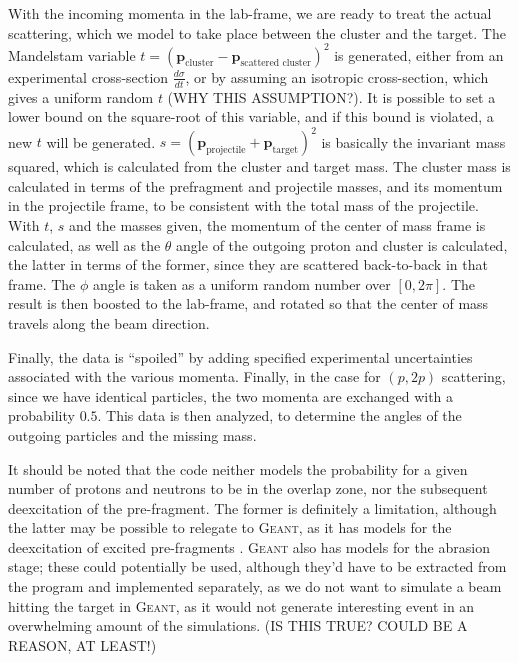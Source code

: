 \documentclass[12pt, a4paper]{article}
\newcommand{\fvec}[1]{\boldsymbol{#1}}
\begin{document}
With the incoming momenta in the lab-frame, we are ready to treat the actual scattering, which we model to take place between the cluster and the target.
The Mandelstam variable $t=(\fvec{p}_\text{cluster} - \fvec{p}_\text{scattered cluster})^2$ is generated, either from an experimental cross-section $\tfrac{d\sigma}{dt}$, or by assuming an isotropic cross-section, which gives a uniform random $t$ (WHY THIS ASSUMPTION?). It is possible to set a lower bound on the square-root of this variable, and if this bound is violated, a new $t$ will be generated.
$s=(\fvec{p}_\text{projectile}+\fvec{p}_\text{target})^2$ is basically the invariant mass squared, which is calculated from the cluster and target mass. The cluster mass is calculated in terms of the prefragment and projectile masses, and its momentum in the projectile frame, to be consistent with the total mass of the projectile. 
With $t$, $s$ and the masses given, the momentum of the center of mass frame is calculated, as well as the $\theta$ angle of the outgoing proton and cluster is calculated, the latter in terms of the former, since they are scattered back-to-back in that frame. The $\phi$ angle is taken as a uniform random number over $[0,2\pi]$. The result is then boosted to the lab-frame, and rotated so that the center of mass travels along the beam direction.

Finally, the data is ``spoiled'' by adding specified experimental uncertainties associated with the various momenta. Finally, in the case for $(p,2p)$ scattering, since we have identical particles, the two momenta are exchanged with a probability $0.5$. This data is then analyzed, to determine the angles of the outgoing particles and the  missing mass. %


It should be noted that the code neither models the probability for a given number of protons and neutrons to be in the overlap zone, nor the subsequent deexcitation of the pre-fragment. The former is definitely a limitation, although the latter may be possible to relegate to \textsc{Geant}, as it has models for the deexcitation of excited pre-fragments \cite{gaa}. \textsc{Geant} also has models for the abrasion stage; these could potentially be used, although they'd have to be extracted from the program and implemented separately, as we do not want to simulate a beam hitting the target in \textsc{Geant}, as it would not generate interesting event in an overwhelming amount of the simulations. (IS THIS TRUE? COULD BE A REASON, AT LEAST!) 
\end{document}

